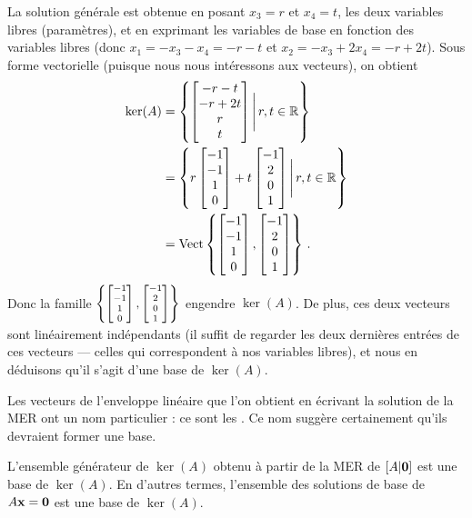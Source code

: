 \begin{myprob}
\begin{mysol}
La solution générale est obtenue en posant $x_3 = r$ et $x_4=t$, les deux variables libres (param\`etres), et en exprimant les variables de base en fonction des
variables libres (donc $x_1 = -x_3-x_4 = -r-t$ et $x_2 = -x_3+2x_4 = -r+2t$). Sous forme vectorielle (puisque nous nous intéressons aux
vecteurs), on obtient
\begin{align*}
\ker(A) &= \left\{ \left[ \begin{matrix} -r-t\\-r+2t\\r\\t \end{matrix} \right] \Bigg|\, r,t\in \mathbb{R}\right\}\\
&=  \left\{ r\left[ \begin{matrix} -1\\-1\\1\\0 \end{matrix} \right]+t\left[ \begin{matrix} -1\\2\\0\\1 \end{matrix} \right] \Bigg|\, r,t\in \mathbb{R}\right\}\\
&= \textrm{Vect}\left\{ \left[ \begin{matrix} -1\\-1\\1\\0 \end{matrix} \right], \left[ \begin{matrix} -1\\2\\0\\1 \end{matrix} \right] \right\}\,.
\end{align*}
Donc la famille $
\left\{ \scriptsize\left[ \begin{matrix} -1\\-1\\1\\0 \end{matrix} \right], \left[ \begin{matrix} -1\\2\\0\\1 \end{matrix} \right] \right\}
$ engendre $\ker(A)$. De plus, ces deux vecteurs sont lin\'eairement ind\'ependants (il suffit de regarder les deux dernières entrées de ces vecteurs --- celles qui correspondent à nos variables libres), et nous en déduisons qu'il s'agit d'une base de $\ker(A)$.
\end{mysol}\end{myprob}

Les vecteurs de l'enveloppe lin\'eaire que l'on obtient en écrivant la solution de la 
MER ont un nom particulier : ce sont les .  Ce nom suggère certainement qu'ils devraient former une base.

\begin{theorem} \label{kernelbasis}

L'ensemble g\'en\'erateur de $\ker(A)$ obtenu à partir de la MER de $[A|\mathbf{0}]$ est une base de $\ker(A)$. En d'autres termes, l'ensemble des solutions de base de $A\mathbf{x}=\mathbf{0}$ est une base de $\ker(A)$.
\end{theorem}

